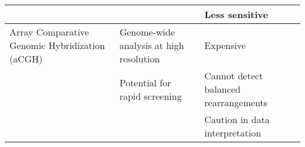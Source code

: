 \begin{longtable}{p{} p{} p{}}
                                                                       &                                                    & Less sensitive                           \\* \midrule
	Array Comparative Genomic Hybridization (aCGH)                     & Genome-wide analysis at high resolution            & Expensive                                \\* %
                                                                       & Potential for rapid screening                      & Cannot detect balanced rearrangements    \\* %
                                                                       &                                                    & Caution in data interpretation           \\* 
\end{longtable}
